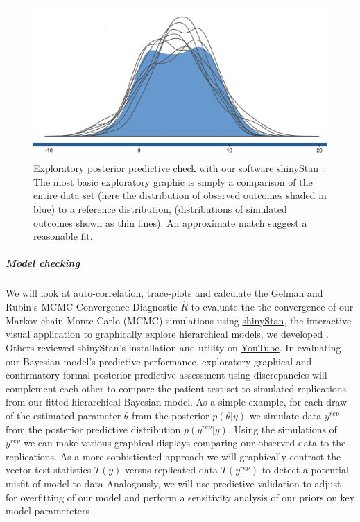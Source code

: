 \documentclass[11pt,notitlepage]{article}
\begin{document}
\begin{figure} 
 \vspace{-15pt}
 \includegraphics[scale=0.2]{Figures/posteriorpredictivecheck.png} 
  \caption{\footnotesize Exploratory posterior predictive check with our software shinyStan \cite{shinystan-software:2015}: The most basic exploratory graphic \cite{Gelman2004posteriorpredictivechecks} is simply a comparison of the entire data set (here the distribution of observed outcomes shaded in blue) to a reference distribution, (distributions of simulated outcomes shown as thin lines). An approximate match suggest a reasonable fit.}
  \label{fig:posteriorpredictivecheck}
  \vspace{-10pt}
\end{figure}
\subparagraph*{Model checking}
We will look at auto-correlation, trace-plots and calculate the Gelman and Rubin's MCMC Convergence Diagnostic $ \hat{R}$ to evaluate the the convergence of our Markov chain Monte Carlo (MCMC) simulations using \href{http://andrewgelman.com/2015/03/02/introducing-shinystan/}{shinyStan}, the interactive visual application to graphically explore hierarchical models, we developed \cite{shinystan-software:2015}. Others reviewed shinyStan's installation and utility on \href{https://www.youtube.com/watch?v=X31xqNHcvQs}{YouTube}. In evaluating our Bayesian model's predictive performance, exploratory graphical \cite{Gelman2004posteriorpredictivechecks} and confirmatory formal posterior predictive assessment using discrepancies \cite{GelmanMengStern1996} will complement each other to compare the patient test set to simulated replications from our fitted hierarchical Bayesian model. As a simple example, for each draw of the estimated parameter $\theta$ from the posterior $p(\theta|y)$ we simulate data $y^{rep}$ from the posterior predictive distribution $ p(y^{rep}|y) $. Using the simulations of $y^{rep}$ we can make various graphical displays comparing our observed data to the replications. As a more sophisticated approach we will graphically contrast the vector test statistics $T(y)$ versus replicated data $T(y^{rep})$ to detect a potential misfit of model to data \cite{Gelman2004posteriorpredictivechecks,Buja1999inference} Analogously, we will use predictive validation to adjust for overfitting of our model and perform a sensitivity analysis of our priors on key model parameteters \cite{Gelman-Hill_2014,Gelman_predictive_2000}.
\end{document}

